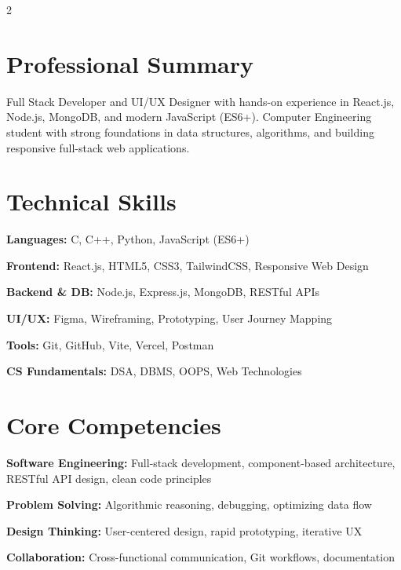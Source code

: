 \documentclass[letterpaper,10pt]{article}
\begin{document}
\setlength{\columnsep}{20pt}
\begin{paracol}{2}


\section{Professional Summary}
\small{Full Stack Developer and UI/UX Designer with hands-on experience in React.js, Node.js, MongoDB, and modern JavaScript (ES6+). Computer Engineering student with strong foundations in data structures, algorithms, and building responsive full-stack web applications.}

\vspace{4pt}

\section{Technical Skills}
\begin{itemize}[leftmargin=0pt, label={}, itemsep=1pt]
  \small{
    \item \textbf{Languages:} C, C++, Python, JavaScript (ES6+)
    \item \textbf{Frontend:} React.js, HTML5, CSS3, TailwindCSS, Responsive Web Design
    \item \textbf{Backend \& DB:} Node.js, Express.js, MongoDB, RESTful APIs
    \item \textbf{UI/UX:} Figma, Wireframing, Prototyping, User Journey Mapping
    \item \textbf{Tools:} Git, GitHub, Vite, Vercel, Postman
    \item \textbf{CS Fundamentals:} DSA, DBMS, OOPS, Web Technologies
  }
\end{itemize}

\vspace{4pt}

\section{Core Competencies}
\begin{itemize}[leftmargin=0pt, label={}, itemsep=1pt]
  \small{
    \item \textbf{Software Engineering:} Full-stack development, component-based architecture, RESTful API design, clean code principles
    \item \textbf{Problem Solving:} Algorithmic reasoning, debugging, optimizing data flow
    \item \textbf{Design Thinking:} User-centered design, rapid prototyping, iterative UX
    \item \textbf{Collaboration:} Cross-functional communication, Git workflows, documentation
  }
\end{itemize}


\end{paracol}
\end{document}
